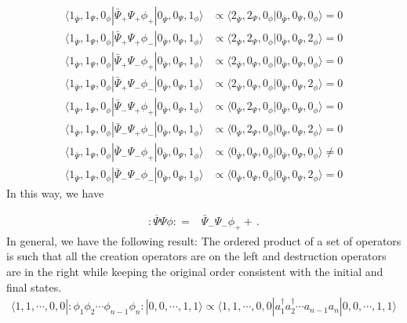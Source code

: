 \begin{align*}
 \langle1_{\bar{\Psi}},1_{\Psi},0_{\phi}|\bar{\Psi}_{+}\Psi_{+}\phi_{+}|0_{\bar{\Psi}},0_{\Psi},1_{\phi}\rangle  &\propto  \langle2_{\bar{\Psi}},2_{\Psi},0_{\phi}|0_{\bar{\Psi}},0_{\Psi},0_{\phi}\rangle =0\\ 
 \langle1_{\bar{\Psi}},1_{\Psi},0_{\phi}|\bar{\Psi}_{+}\Psi_{+}\phi_{-}|0_{\bar{\Psi}},0_{\Psi},1_{\phi}\rangle  &\propto  \langle2_{\bar{\Psi}},2_{\Psi},0_{\phi}|0_{\bar{\Psi}},0_{\Psi},2_{\phi}\rangle =0\\ 
 \langle1_{\bar{\Psi}},1_{\Psi},0_{\phi}|\bar{\Psi}_{+}\Psi_{-}\phi_{+}|0_{\bar{\Psi}},0_{\Psi},1_{\phi}\rangle  &\propto  \langle2_{\bar{\Psi}},0_{\Psi},0_{\phi}|0_{\bar{\Psi}},0_{\Psi},0_{\phi}\rangle =0\\ 
 \langle1_{\bar{\Psi}},1_{\Psi},0_{\phi}|\bar{\Psi}_{+}\Psi_{-}\phi_{-}|0_{\bar{\Psi}},0_{\Psi},1_{\phi}\rangle  &\propto  \langle2_{\bar{\Psi}},0_{\Psi},0_{\phi}|0_{\bar{\Psi}},0_{\Psi},2_{\phi}\rangle =0\\ 
 \langle1_{\bar{\Psi}},1_{\Psi},0_{\phi}|\bar{\Psi}_{-}\Psi_{+}\phi_{+}|0_{\bar{\Psi}},0_{\Psi},1_{\phi}\rangle  &\propto  \langle0_{\bar{\Psi}},2_{\Psi},0_{\phi}|0_{\bar{\Psi}},0_{\Psi},0_{\phi}\rangle =0\\ 
 \langle1_{\bar{\Psi}},1_{\Psi},0_{\phi}|\bar{\Psi}_{-}\Psi_{+}\phi_{-}|0_{\bar{\Psi}},0_{\Psi},1_{\phi}\rangle  &\propto  \langle0_{\bar{\Psi}},2_{\Psi},0_{\phi}|0_{\bar{\Psi}},0_{\Psi},2_{\phi}\rangle =0\\ 
 \langle1_{\bar{\Psi}},1_{\Psi},0_{\phi}|\bar{\Psi}_{-}\Psi_{-}\phi_{+}|0_{\bar{\Psi}},0_{\Psi},1_{\phi}\rangle  &\propto  \langle0_{\bar{\Psi}},0_{\Psi},0_{\phi}|0_{\bar{\Psi}},0_{\Psi},0_{\phi}\rangle \neq 0\\
 \langle1_{\bar{\Psi}},1_{\Psi},0_{\phi}|\bar{\Psi}_{-}\Psi_{-}\phi_{-}|0_{\bar{\Psi}},0_{\Psi},1_{\phi}\rangle  &\propto  \langle0_{\bar{\Psi}},0_{\Psi},0_{\phi}|0_{\bar{\Psi}},0_{\Psi},2_{\phi}\rangle =0
\end{align*}
In this way, we have

\begin{align}
:\overline{\Psi}\Psi\phi: =&\bar{\Psi}_{-}\Psi_{-}\phi_{+}+\,.
\end{align}
In general, we have the following result: The ordered product of a set of operators is such that all the creation operators are on the left and destruction operators are in the right while keeping the original order consistent with the initial and final states.
\begin{align}
\langle 1,1,\cdots,0,0|  :\phi_1 \phi_2 \cdots \phi_{n-1}\phi_n:|0,0,\cdots,1,1\rangle
\propto \langle 1,1,\cdots,0,0| a_1^{\dagger} a_2^{\dagger}\cdots a_{n-1}a_n|0,0,\cdots,1,1\rangle
\end{align}


